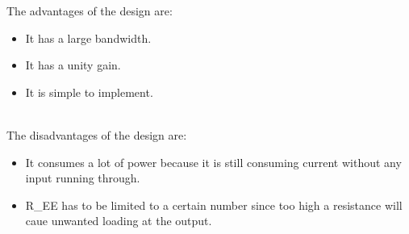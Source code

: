 \documentclass[12pt]{article}
\begin{document}
The advantages of the design are: 
\begin{itemize}
    \item It has a large bandwidth.
    \item It has a unity gain.
    \item It is simple to implement.
\end{itemize} \\

The disadvantages of the design are: 
\begin{itemize}
    \item It consumes a lot of power because it is still consuming current without any input running through.
    \item R_{EE} has to be limited to a certain number since too high a resistance will caue unwanted loading at the output.
\end{itemize}
\end{document}
